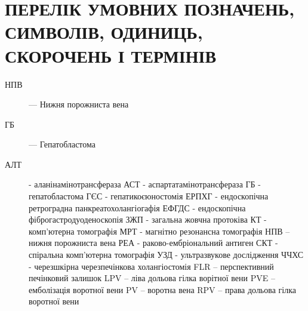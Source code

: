 \chapter{ПЕРЕЛІК УМОВНИХ ПОЗНАЧЕНЬ, СИМВОЛІВ, ОДИНИЦЬ, СКОРОЧЕНЬ І ТЕРМІНІВ}

\begin{description}
\item[НПВ] --- Нижня порожниста вена
\item[ГБ] --- Гепатобластома
\item[АЛТ]      -  аланінамінотрансфераза
АСТ      -  аспартатамінотрансфераза
ГБ - гепатобластома
ГЄС        -  гепатикоєюностомія
ЕРПХГ   -  ендоскопічна ретроградна панкреатохолангіогафія
ЕФГДС  -  ендоскопічна фіброгастродуоденоскопія
ЗЖП       -  загальна жовчна протоківа
КТ          -  комп’ютерна томографія
МРТ       -  магнітно резонансна томографія
НПВ – нижня порожниста вена
РЕА  - раково-ембріональний антиген
СКТ - спіральна комп’ютерна томографія
УЗД       -  ультразвукове дослідження
ЧЧХС   -  черезшкірна черезпечінкова холангіостомія
FLR – перспективний печінковий залишок
LPV – ліва дольова гілка ворітної вени 
PVE – емболізація воротної вени
PV – воротна вена 
RPV – права  дольова гілка воротної вени

\end{description}